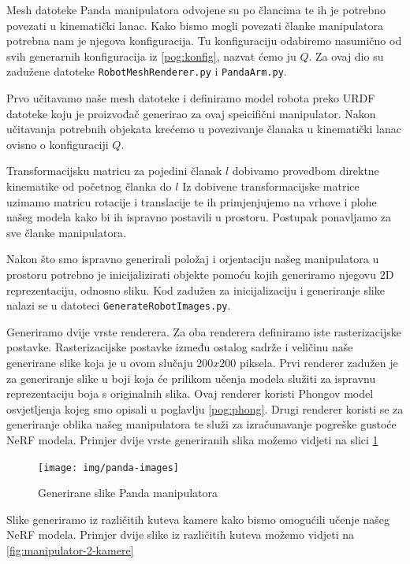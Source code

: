 \documentclass[times, utf8, diplomskirad]{fer}
\begin{document}
Mesh datoteke Panda manipulatora odvojene su po člancima te ih je potrebno povezati u kinematički lanac.
Kako bismo mogli povezati članke manipulatora potrebna nam je njegova konfiguracija.
Tu konfiguraciju odabiremo nasumično od svih generarnih konfiguracija iz \ref{pog:konfig}, nazvat ćemo ju $Q$.
Za ovaj dio su zadužene datoteke \texttt{RobotMeshRenderer.py} i \texttt{PandaArm.py}.
\newpage

Prvo učitavamo naše mesh datoteke i definiramo model robota preko URDF datoteke koju je proizvođač generirao za ovaj speicifični manipulator.
Nakon učitavanja potrebnih objekata krećemo u povezivanje članaka u kinematički lanac ovisno o konfiguraciji $Q$.

Transformacijsku matricu za pojedini članak $l$ dobivamo provedbom direktne kinematike od početnog članka do $l$
Iz dobivene transformacijske matrice uzimamo matricu rotacije i translacije te ih primjenjujemo na vrhove i plohe našeg modela kako bi ih ispravno postavili u prostoru.
Postupak ponavljamo za sve članke manipulatora.

Nakon što smo ispravno generirali položaj i orjentaciju našeg manipulatora u prostoru potrebno je inicijalizirati objekte pomoću kojih generiramo njegovu 2D reprezentaciju, odnosno sliku.
Kod zadužen za inicijalizaciju i generiranje slike nalazi se u datoteci \texttt{GenerateRobotImages.py}.

Generiramo dvije vrste renderera.
Za oba renderera definiramo iste rasterizacijske postavke.
Rasterizacijske postavke između ostalog sadrže i veličinu naše generirane slike koja je u ovom slučaju $200x200$ piksela.
Prvi renderer zadužen je za generiranje slike u boji koja će prilikom učenja modela služiti za ispravnu reprezentaciju boja s originalnih slika.
Ovaj renderer koristi Phongov model osvjetljenja kojeg smo opisali u poglavlju \ref{pog:phong}.
Drugi renderer koristi se za generiranje oblika našeg manipulatora te služi za izračunavanje pogreške gustoće NeRF modela.
Primjer dvije vrste generiranih slika možemo vidjeti na slici \ref{fig:slika-manipulator}

\begin{figure}[H]
    \centering
    \texttt{[image: img/panda-images]}
    \caption{Generirane slike Panda manipulatora}
    \label{fig:slika-manipulator}
\end{figure}

Slike generiramo iz različitih kuteva kamere kako bismo omogućili učenje našeg NeRF modela.
Primjer dvije slike iz različitih kuteva možemo vidjeti na \ref{fig:manipulator-2-kamere}
\end{document}
